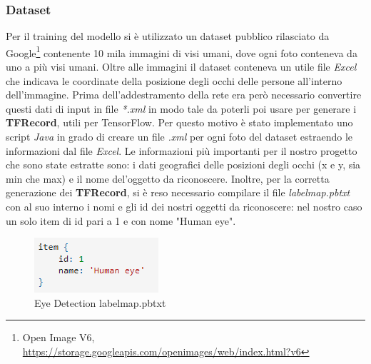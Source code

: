 \documentclass[11pt]{article}
\begin{document}
\subsubsection{Dataset}
Per il training del modello si è utilizzato un dataset pubblico rilasciato da Google\footnote{Open Image V6, \url{https://storage.googleapis.com/openimages/web/index.html?v6}} contenente 10 mila immagini di visi umani, dove ogni foto conteneva da uno a più visi umani.
\newline
Oltre alle immagini il dataset conteneva un utile file \textit{Excel} che indicava le coordinate della posizione degli occhi delle persone all'interno dell'immagine.
\newline \newline
Prima dell'addestramento della rete era però necessario convertire questi dati di input in file \textit{*.xml} in modo tale da poterli poi usare per generare i \textbf{TFRecord}, utili per TensorFlow. Per questo motivo è stato implementato uno script \textit{Java} in grado di creare un file \textit{.xml} per ogni foto del dataset estraendo le informazioni dal file \textit{Excel}. Le informazioni più importanti per il nostro progetto che sono state estratte sono: i dati geografici delle posizioni degli occhi (x e y, sia min che max) e il nome del'oggetto da riconoscere. 
Inoltre, per la corretta generazione dei \textbf{TFRecord}, si è reso necessario compilare il file \textit{labelmap.pbtxt} con al suo interno i nomi e gli id dei nostri oggetti da riconoscere: nel nostro caso un solo item di id pari a 1 e con nome "Human eye".

\begin{figure}[h]
\caption{Eye Detection labelmap.pbtxt}
\centering
\includegraphics[scale=1]{img/item.png}
\end{figure}
\end{document}
